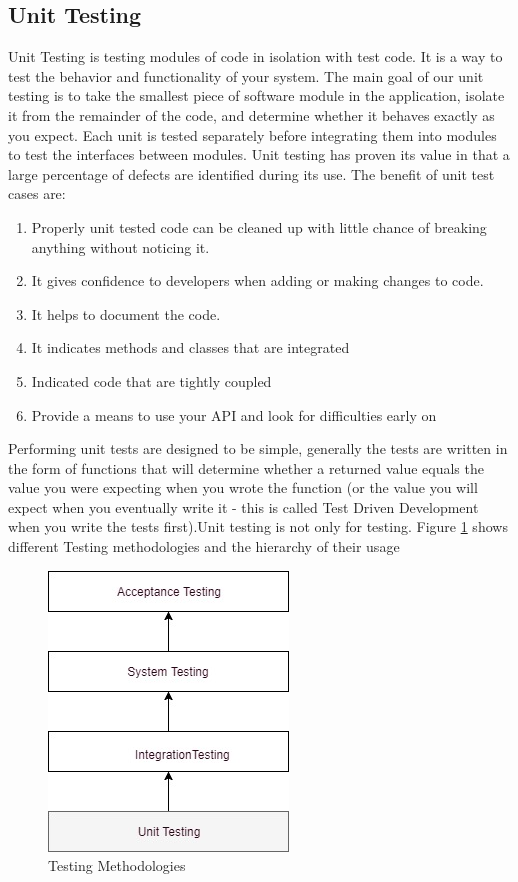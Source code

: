 \documentclass[article,type=msc,colorback,accentcolor=tud9c,twoside,11pt]{tudthesis}
\begin{document}
\subsection{Unit Testing}
Unit Testing\cite{EffectivnessofUnitTest} is testing modules of code in isolation with test code. It is a way to test the behavior and functionality of your system. The main goal of our unit testing is to take the smallest piece of software module in the application, isolate it from the remainder of the code, and determine whether it behaves exactly as you expect. Each unit is tested separately before integrating them into modules to test the interfaces between modules. Unit testing has proven its value in that a large percentage of defects are identified during its use. The benefit of unit test cases are:
\begin{enumerate}
	\item Properly unit tested code can be cleaned up with little chance of breaking anything without noticing it.
	\item It gives confidence to developers when adding or making changes to code.
	\item It helps to document the code.
	\item It indicates methods and classes that are integrated 
	\item Indicated code that are tightly coupled
	\item Provide a means to use your API and look for difficulties early on 
\end{enumerate}
Performing unit tests are designed to be simple, generally the tests are written in the form of functions that will determine whether a returned value equals the value you were expecting when you wrote the function (or the value you will expect when you eventually write it - this is called Test Driven Development when you write the tests first).Unit testing is not only for testing. Figure \ref{fig:Testingmethodologies} shows different Testing methodologies and the hierarchy of their usage
\begin{figure}[h]
	\centering
	\includegraphics[scale=0.7]{Testing.jpg}
	\caption{Testing Methodologies}
	\label{fig:Testingmethodologies}
\end{figure}
\end{document}
